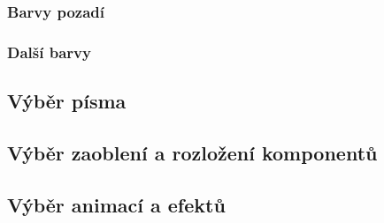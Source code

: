 



\subsubsection{Barvy pozadí}


\subsubsection{Další barvy}


\subsection{Výběr písma}

\subsection{Výběr zaoblení a rozložení komponentů}

\subsection{Výběr animací a efektů}

